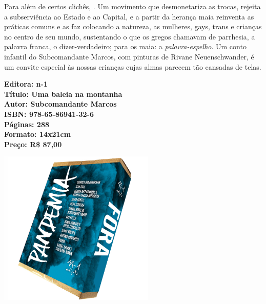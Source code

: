 \medskip

\noindent{}Para além de certos clichês, . Um movimento que desmonetariza as trocas, rejeita a subserviência ao Estado e ao Capital, e a partir da herança maia reinventa as práticas comuns e as faz colocando a natureza, as mulheres, gays, trans e crianças no centro de seu mundo, sustentando o que os gregos chamavam de parrhesia, a palavra franca, o dizer-verdadeiro; para os maia: a \textit{palavra-espelho}. Um conto infantil do Subcomandante Marcos, com pinturas de Rivane Neuenschwander, é um convite especial às nossas crianças cujas almas parecem tão cansadas de telas.

\vfill

\hspace*{-.4cm}\begin{minipage}[c]{.5\linewidth}
\small\textbf{
\hspace*{-.1cm}Editora: n-1\\
Título: Uma baleia na montanha\\
Autor: Subcomandante Marcos\\ 
ISBN: 978-65-86941-32-6\\
Páginas: 288\\
Formato: 14x21cm\\
Preço: R\$ 87,00\\
}
\end{minipage}

\pagebreak

\begin{center}
\hspace*{.5cm}\includegraphics[width=74mm]{./CAPAS/caixa.jpg}
\end{center}

